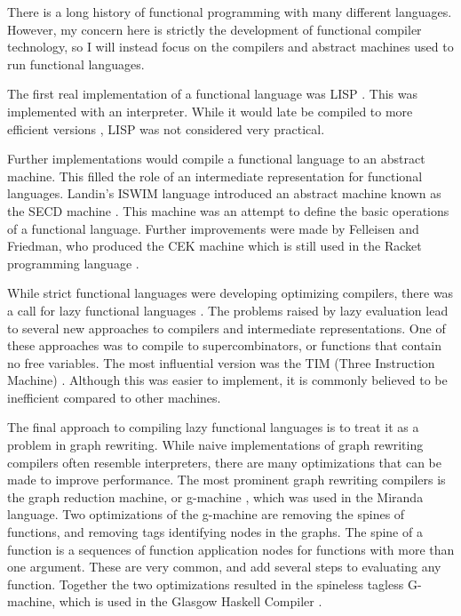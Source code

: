 
There is a long history of functional programming with many different languages.
However, my concern here is strictly the development of functional compiler technology,
so I will instead focus on the compilers and abstract machines used to run functional languages.

The first real implementation of a functional language was LISP \cite{lisp}.
This was implemented with an interpreter.
While it would late be compiled to more efficient versions \cite{steele78,orbit},
LISP was not considered very practical.

Further implementations would compile a functional language to an abstract machine.
This filled the role of an intermediate representation for functional languages.
Landin's ISWIM language introduced an abstract machine known as the SECD machine \cite{secd}.
This machine was an attempt to define the basic operations of a functional language.
Further improvements were made by Felleisen and Friedman, who produced the CEK machine which is still used in the Racket
programming language \cite{cek}.

While strict functional languages were developing optimizing compilers,
there was a call for lazy functional languages \cite{cons-args}.
The problems raised by lazy evaluation lead to several new approaches to compilers
and intermediate representations.
One of these approaches was to compile to supercombinators,
or functions that contain no free variables.
The most influential version was the TIM (Three Instruction Machine) \cite{tim}.
Although this was easier to implement, it is commonly believed to be inefficient compared to other machines.

The final approach to compiling lazy functional languages is to treat it as a problem in
graph rewriting.
While naive implementations of graph rewriting compilers often resemble interpreters,
there are many optimizations that can be made to improve performance.
The most prominent graph rewriting compilers
is the graph reduction machine, or g-machine \cite{gmachine},
which was used in the Miranda language. 
Two optimizations of the g-machine are removing the spines of functions,
and removing tags identifying nodes in the graphs.
The spine of a function is a sequences of function application
nodes for functions with more than one argument.
These are very common, and add several steps to evaluating any function.
Together the two optimizations resulted in the spineless tagless G-machine,
which is used in the Glasgow Haskell Compiler \cite{functional_PeytonJones, ghc}.

